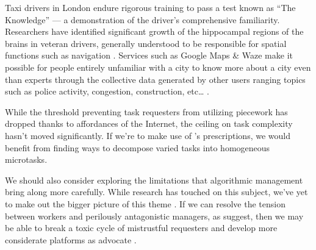 \documentclass[trackingWork]{subfiles}
\begin{document}
Taxi drivers in London endure rigorous training to pass a test known as ``The Knowledge''
--- a demonstration of the driver's comprehensive familiarity.
Researchers have identified significant growth of
the hippocampal regions of the brains in veteran drivers,
generally understood to be responsible for spatial functions such as navigation
\cite{Maguire11042000,Maguire2894,Skok:1999:KML:299513.299625,
      skok2000managing,Woollett1407,woollett2011acquiring}.
Services such as Google Maps \& Waze make it possible for
people entirely unfamiliar with a city
to know more about a city even than experts through
the collective data generated by other users
ranging topics such as police activity, congestion, construction, etc\dots
\cite{silva2013traffic,hind2014outsmarting}. 

\subsubsubsection{\implication}
While the threshold preventing task requesters from utilizing piecework
has dropped thanks to affordances of the Internet, the ceiling on task complexity hasn't moved significantly. 
If we're to make use of \citeauthor{Brown01041990}'s prescriptions,
we would benefit from finding ways to decompose varied tasks into homogeneous microtasks. 

We should also consider exploring the limitations that algorithmic management bring along more carefully.
While research has touched on this subject, we've yet to make out the bigger picture of this theme
\cite{uberAlgorithm}.
If we can resolve the tension between workers and perilously antagonistic managers, as \citeauthor{10.2307/2118435} suggest,
then we may be able to break a toxic cycle of mistrustful requesters \cite[for example][]{MaliciousCrowdworkersGadiraju}
and develop more considerate platforms as \citeauthor{takingAHITMcInnis} advocate
\cite{takingAHITMcInnis}.
\end{document}
